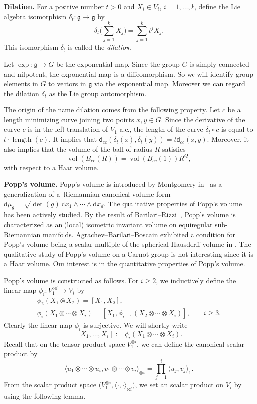 \documentclass[10pt,a4paper]{amsart}
\numberwithin{equation}{section}
\newcommand{\g}{\mathfrak{g}}
\begin{document}
{\bf Dilation.}
For a positive number $t>0$ and $X_i\in V_i$, $i=1,\dots,k$,
define the Lie algebra isomorphism $\delta_t\colon\g\to\g$ by
\[
\delta_t\Bigg(\sum_{j=1}^kX_j\Bigg)=\sum_{j=1}^kt^jX_j.
\]
This isomorphism $\delta_t$ is called the \textit{dilation}.

Let $\exp\colon \g\to G$ be the exponential map.
Since the group $G$ is simply connected and nilpotent,
the exponential map is a diffeomorphism.
So we will identify group elements in $G$ to vectors in $\g$ via the exponential map.
Moreover we can regard the dilation $\delta_t$ as the Lie group automorphism.

The origin of the name dilation comes from the following property.
Let $c$ be a length minimizing curve joining two points $x,y\in G$.
Since the derivative of the curve $c$ is in the left translation of $V_1$ a.e.,
the length of the curve $\delta_t\circ c$ is equal to $t\cdot \operatorname{length}(c)$.
It implies that $\mathsf{d}_{cc}(\delta_t(x),\delta_t(y))=t\mathsf{d}_{cc}(x,y)$.
Moreover,
it also implies that the volume of the ball of radius $R$ satisfies
\begin{equation}\label{homogeneous}
 \operatorname{vol}(B_{cc}(R))=\operatorname{vol}(B_{cc}(1))R^Q,
\end{equation}
with respect to a Haar volume.

{\bf Popp's volume.}
Popp's volume is introduced by Montgomery in~\cite{mon} as a gene\-ra\-li\-za\-tion of a~Riemannian canonical volume form $\mathrm{d}\mu_g=\sqrt{\det(g)}\,\mathrm{d}x_1\wedge\cdots\wedge \mathrm{d}x_d$.
The qualitative properties of Popp's volume has been actively studied.
By the result of Barilari--Rizzi~\cite{bar},
Popp's volume is characterized as an (local) isometric invariant volume on equiregular sub-Riemannian manifolds.
Agrachev--Barilari--Boscain exhibited a condition for Popp's volume being a scalar multiple of the spherical Hausdorff volume in \cite{agr2}.
The qualitative study of Popp's volume on a Carnot group is not interesting since it is a Haar volume.
Our interest is in the quantitative properties of Popp's volume.

Popp's volume is constructed as follows.
For $i\geq 2$,
we inductively define the linear map $\phi_i\colon V_1^{\otimes i}\to V_i$ by
\begin{gather*}
\phi_2(X_1\otimes X_2)=[X_1,X_2],
\\
\phi_i(X_1\otimes \cdots \otimes X_i)=[X_1,\phi_{i-1}(X_2\otimes \cdots\otimes X_i)],\qquad i\geq 3.
\end{gather*}
Clearly the linear map $\phi_i$ is surjective.
We will shortly write
\[
[X_1,\dots,X_i]:=\phi_i(X_1\otimes\cdots\otimes X_i).
\]
Recall that on the tensor product space $V_1^{\otimes i}$,
we can define the canonical scalar product by
\[
\langle u_1\otimes\cdots\otimes u_i,v_1\otimes \cdots\otimes v_i\rangle_{\otimes i}=\prod_{j=1}^i\langle u_j,v_j\rangle_1.
\]
From the scalar product space $\big(V_1^{\otimes i},\langle\cdot,\cdot\rangle_{\otimes i}\big)$,
we set an scalar product on $V_i$ by using the following lemma.
\end{document}
